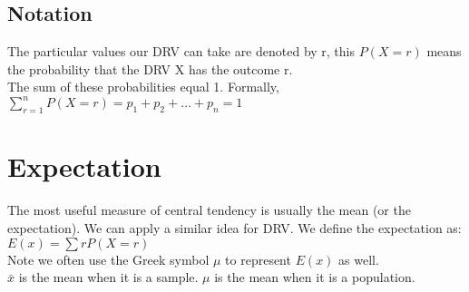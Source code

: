 \documentclass[a4paper,12pt]{article}
\begin{document}
\subsection*{Notation}
The particular values our DRV can take are denoted by r, this $P(X = r)$ means the probability that the DRV X has the outcome r. \\
The sum of these probabilities equal 1. Formally, $\sum_{r=1}^n P(X=r) = p_1 + p_2 + \dots + p_n = 1$\\

\section*{Expectation}
The most useful measure of central tendency is usually the mean (or the expectation). We can apply a similar idea for DRV. We define the expectation as: \\
$E(x) = \sum r P(X=r)$ \\
Note we often use the Greek symbol $\mu$ to represent $E(x)$ as well.\\
$\bar{x}$ is the mean when it is a sample.
$\mu$ is the mean when it is a population.
\end{document}
